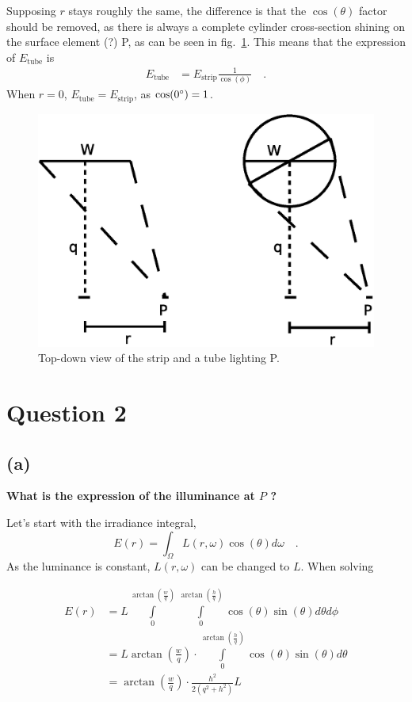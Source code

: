 \documentclass{report}
\begin{document}
Supposing $r$ stays roughly the same, the difference is that the $\cos(\theta)$ factor should be removed, as there is always a complete cylinder cross-section shining on the surface element (?) P, as can be seen in fig.~\ref{q1c:setup}. This means that the expression of $E_{\text{tube}}$ is
\begin{align}
E_{\text{tube}} &= E_{\text{strip}} \frac{1}{\cos(\phi)}%
\quad.
\end{align}
When $r = 0$, $E_{\text{tube}} = E_{\text{strip}}$, as $\cos(0\degree) = 1$.

\begin{figure}
  \centering
  \includegraphics[width=0.45\linewidth]{q1c_setup.eps}
  \caption[Problem setup]
   {Top-down view of the strip and a tube lighting P.}
  \label{q1c:setup}
\end{figure}

\section{Question 2}
\subsection{(a)}
\textbf{What is the expression of the illuminance at $P$ ?}

Let's start with the irradiance integral,
\begin{equation}
E(r) = \int_{\Omega} L(r,\omega)\cos(\theta) d\omega
\quad.
\end{equation}
As the luminance is constant, $L(r,\omega)$ can be changed to $L$. When solving 

\begin{align}
E(r) &= L \int\limits_{0}^{\arctan\left(\frac{w}{q}\right)} \int\limits_{0}^{\arctan\left(\frac{h}{q}\right)} \cos(\theta) \sin(\theta) d\theta d\phi \\
     &= L \arctan\left(\frac{w}{q}\right) \cdot \int\limits_{0}^{\arctan\left(\frac{h}{q}\right)} \cos(\theta) \sin(\theta) d\theta \\
     &= \arctan\left(\frac{w}{q}\right) \cdot \frac{h^2}{2 \left(q^2 + h^2\right)} L
\end{align}
\end{document}
